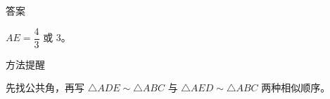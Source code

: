 \documentclass{exam-zh}
\begin{document}
\begin{eduBottomGrid}
  \begin{eduSummaryLeft}
    \begin{eduSummaryBlock}{\eduIconCheck}{答案}
    \begin{eduPlainList}
      \item $AE=\dfrac43$ 或 $3$。    \end{eduPlainList}
    \end{eduSummaryBlock}
  \end{eduSummaryLeft}
  \eduSummaryDivider
  \begin{eduSummaryRight}
    \begin{eduSummaryBlock}{\eduIconPin}{方法提醒}
    \begin{eduBulletList}
      \item 先找公共角，再写 $\triangle ADE\sim\triangle ABC$ 与 $\triangle AED\sim\triangle ABC$ 两种相似顺序。    \end{eduBulletList}
    \end{eduSummaryBlock}
  \end{eduSummaryRight}
\end{eduBottomGrid}
\end{document}
